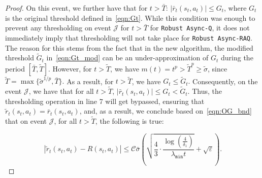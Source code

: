 \documentclass{article}
\newcommand{\mc}{\mathcal}
\begin{document}
\begin{proof}
On this event, we further have that for $t > \bar{T}$: $|\bar{r}_t(s_t, a_t)| \leq G_t$, where $G_t$ is the original threshold defined in~\eqref{eqn:Gt}. While this condition was enough to prevent any thresholding on event $\mc{J}$ for $t > \bar{T}$ for \texttt{Robust Async-Q}, it does not immediately imply that thresholding will not take place for \texttt{Robust Async-RAQ}. The reason for this stems from the fact that in the new algorithm, the modified threshold $\tilde{G}_t$ in~\eqref{eqn:Gt_mod} can be an under-approximation of $G_t$ during the period $[\bar{T}, \tilde{T}]$. However, for $t > \tilde{T}$, we have $m(t) = t^p > \tilde{T}^p \geq \tilde{\sigma}$, since $\tilde{T}=\max\{\tilde{\sigma}^{1/p}, \bar{T}\}.$ As a result, for $t > \tilde{T}$, we have $G_t \leq  \tilde{G}_t.$ Consequently, on the event $\mc{J}$, we have that for all $t > \tilde{T}$, $|\bar{r}_t(s_t, a_t)| \leq G_t < \tilde{G}_t$. Thus, the thresholding operation in line 7 will get bypassed, ensuring that $\tilde{r}_t(s_t, a_t) = \bar{r}_t(s_t, a_t)$, and, as a result, we conclude based on~\eqref{eqn:OG_bnd} that on event $\mc{J}$, for all $t > \tilde{T}$, the following is true: 

\begin{equation}\label{eqn:Newthresh_bnd}
        \left| \tilde{r}_t(s_t, a_t) - R(s_t, a_t) \right| 
        \leq \mc{C} \bar{\sigma} \left( 
            \sqrt{ \frac{4}{3} \cdot \frac{ \log\left( \frac{4}{\delta_1} \right) }{ \lambda_{\texttt{min}} t } } 
            + \sqrt{\varepsilon} 
        \right). 
\end{equation}


\end{proof}
\end{document}
